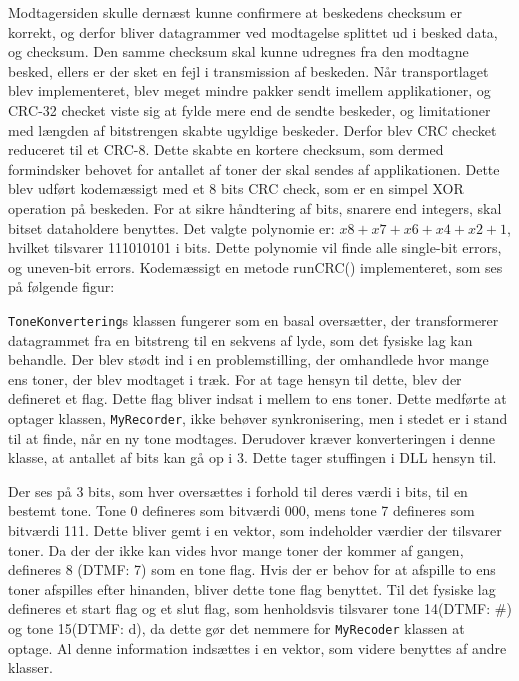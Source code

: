 Modtagersiden skulle dernæst kunne confirmere at beskedens checksum er korrekt, og derfor bliver datagrammer ved modtagelse splittet ud i besked data, og checksum. Den samme checksum skal kunne udregnes fra den modtagne besked, ellers er der sket en fejl i transmission af beskeden.
\newline
Når transportlaget blev implementeret, blev meget mindre pakker sendt imellem applikationer, og CRC-32 checket viste sig at fylde mere end de sendte beskeder, og limitationer med længden af bitstrengen skabte ugyldige beskeder. Derfor blev CRC checket reduceret til et CRC-8. Dette skabte en kortere checksum, som dermed formindsker behovet for antallet af toner der skal sendes af applikationen.
\newline
Dette blev udført kodemæssigt med et 8 bits CRC check, som er en simpel XOR operation på beskeden. For at sikre håndtering af bits, snarere end integers, skal bitset dataholdere benyttes.
\newline
Det valgte polynomie er: $x8 + x7 + x6 + x4 + x2 + 1$, hvilket tilsvarer 111010101 i bits. Dette polynomie vil finde alle single-bit errors, og uneven-bit errors.
Kodemæssigt en metode runCRC() implementeret, som ses på følgende figur:
\hfill \break

\texttt{ToneKonvertering}s klassen fungerer som en basal oversætter, der transformerer datagrammet fra en bitstreng til en sekvens af lyde, som det fysiske lag kan behandle.
\newline
Der blev stødt ind i en problemstilling, der omhandlede hvor mange ens toner, der blev modtaget i træk. For at tage hensyn til dette, blev der defineret et flag. Dette flag bliver indsat i mellem to ens toner. Dette medførte at optager klassen, \texttt{MyRecorder}, ikke behøver synkronisering, men i stedet er i stand til at finde, når en ny tone modtages. Derudover kræver konverteringen i denne klasse, at antallet af bits kan gå op i 3. Dette tager stuffingen i DLL hensyn til.
\hfill \break

Der ses på 3 bits, som hver oversættes i forhold til deres værdi i bits, til en bestemt tone.
\newline
Tone 0 defineres som bitværdi 000, mens tone 7 defineres som bitværdi 111. Dette bliver gemt i en vektor, som indeholder værdier der tilsvarer toner.
\newline
Da der der ikke kan vides hvor mange toner der kommer af gangen, defineres 8 (DTMF: 7) som en tone flag. Hvis der er behov for at afspille to ens toner afspilles efter hinanden, bliver dette tone flag benyttet.
\newline
Til det fysiske lag defineres et start flag og et slut flag, som henholdsvis tilsvarer tone 14(DTMF: \#) og tone 15(DTMF: d), da dette gør det nemmere for \texttt{MyRecoder} klassen at optage.
\newline
 Al denne information indsættes i en vektor, som videre benyttes af andre klasser.
 